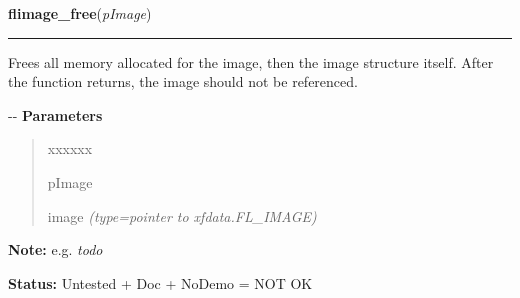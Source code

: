     \label{xformslib:flflimage:flimage_free}

    \vspace{0.5ex}

\hspace{.8\funcindent}\begin{boxedminipage}{\funcwidth}

    \raggedright \textbf{flimage\_free}(\textit{pImage})

    \vspace{-1.5ex}

    \rule{\textwidth}{0.5\fboxrule}
\setlength{\parskip}{2ex}

Frees all memory allocated for the image, then the image structure
itself. After the function returns, the image should not be referenced.

-{}-
\setlength{\parskip}{1ex}
      \textbf{Parameters}
      \vspace{-1ex}

      \begin{quote}
        \begin{Ventry}{xxxxxx}

          \item[pImage]


image
            {\it (type=pointer to xfdata.FL\_IMAGE)}

        \end{Ventry}

      \end{quote}

\textbf{Note:} 
e.g. \emph{todo}


\textbf{Status:} 
Untested + Doc + NoDemo = NOT OK


    \end{boxedminipage}

    \label{xformslib:flflimage:flimage_display}

    \vspace{0.5ex}

